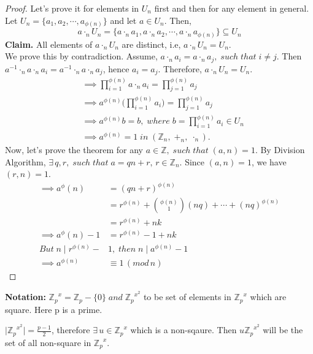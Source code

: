 \documentclass[10pt,a4paper]{article}
\begin{document}
\begin{proof}
Let's prove it for elements in $U_n$ first and then for any element in general. Let $U_n = \{a_1,a_2,\cdots,a_{\phi(n)}\}$ and let $a\in U_n.$ Then,
$$a\cdot_n U_n=\{a\cdot_n a_1,a\cdot_n a_2,\cdots,a\cdot_n a_{\phi(n)}\}\subseteq U_n$$
\textbf{Claim.} All elements of $a\cdot_n U_n$ are distinct, i.e, $a\cdot_n U_n = U_n$. \\
We prove this by contradiction. Assume, $a\cdot_n a_i = a\cdot_n a_j,\;such\;that\;i\neq j$. Then $a^{-1}\cdot_n a\cdot_n a_i = a^{-1}\cdot_n a\cdot_n a_j$, hence $a_i=a_j$. Therefore, $a\cdot_n U_n = U_n$. 
\begin{align*}
&\implies \prod_{i=1}^{\phi(n)}a\cdot_n a_i = \prod_{j=1}^{\phi(n)}a_j \\
&\implies a^{\phi(n)}\Bigg(\prod_{i=1}^{\phi(n)}a_i\Bigg) = \prod_{j=1}^{\phi(n)}a_j \\
&\implies a^{\phi(n)}b = b,\;where\;b=\prod_{i=1}^{\phi(n)}a_i \in U_n \\
&\implies a^{\phi(n)} = 1\;in\;(\mathbb{Z}_{n},\;+_{n},\;\cdot_{n}).
\end{align*}
Now, let's prove the theorem for any $a\in\mathbb{Z},\;such\;that\;(a,n)=1.$
By Division Algorithm, $\exists\,q,r,\;such\;that\;a=qn+r,\,r\in\mathbb{Z}_n.$ Since $(a,n)=1$, we have $(r,n)=1$.
\begin{align*}
\implies a^\phi(n) &= (qn+r)^{\phi(n)} \\
&= r^{\phi(n)} +  \binom{\phi(n)}{1}(nq)+\cdots+(nq)^{\phi(n)} \\
&= r^{\phi(n)} +nk \\
\implies a^\phi(n)-1 &=r^{\phi(n)}-1+nk \\
But\;n\mid r^{\phi(n)}-&1,\;then\;n\mid a^{\phi(n)}-1\\
\implies a^{\phi(n)}&\equiv 1\,(mod\,n)
\end{align*}
\end{proof}
\textbf{Notation:} ${\mathbb{Z}_p}^x=\mathbb{Z}_p-\{0\}\;and\;{\mathbb{Z}_p}^{x^2}$ to be set of elements in ${\mathbb{Z}_p}^x$ which are square. Here p is a prime.

\begin{prop}
$\vert {\mathbb{Z}_p}^{x^2}\vert=\frac{p-1}{2}$, therefore $\exists\,u\in{\mathbb{Z}_p}^x$ which is a non-sqaure. Then $u{\mathbb{Z}_p}^{x^2}$ will be the set of all non-square in ${\mathbb{Z}_p}^x$.
\end{prop}
\end{document}
